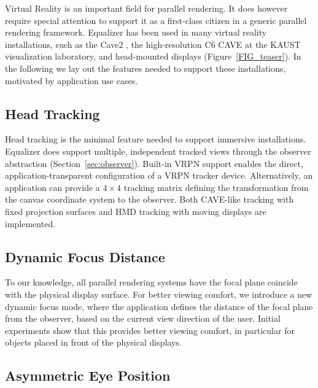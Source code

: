 \documentclass[10pt,journal,compsoc]{IEEEtran}
\newcommand{\sref}[1]{Section~\ref{#1}}
\newcommand{\fig}[1]{Figure~\ref{#1}}
\begin{document}
Virtual Reality is an important field for parallel rendering. It does however
require special attention to support it as a first-class citizen in a generic
parallel rendering framework. \textsf{Equalizer} has been used in many virtual
reality installations, such as the Cave2 \cite{FNTTL:13}, the high-resolution C6
CAVE at the KAUST visualization laboratory, and head-mounted displays
(\fig{FIG_teaser}). In the following we lay out the features needed to support
these installations, motivated by application use cases.

\subsection{Head Tracking}

Head tracking is the minimal feature needed to support immersive installations.
\textsf{Equalizer} does support multiple, independent tracked views through the
observer abstraction (\sref{sec:observer}). Built-in VRPN support enables the
direct, application-transparent configuration of a VRPN tracker device.
Alternatively, an application can provide a $4\times 4$ tracking matrix defining
the transformation from the canvas coordinate system to the observer. Both
CAVE-like tracking with fixed projection surfaces and HMD tracking with moving
displays are implemented.

\subsection{Dynamic Focus Distance}

To our knowledge, all parallel rendering systems have the focal plane coincide
with the physical display surface. For better viewing comfort, we introduce a
new dynamic focus mode, where the application defines the distance of the focal
plane from the observer, based on the current view direction of the user.
Initial experiments show that this provides better viewing comfort, in
particular for objects placed in front of the physical displays.

\subsection{Asymmetric Eye Position}
\end{document}
